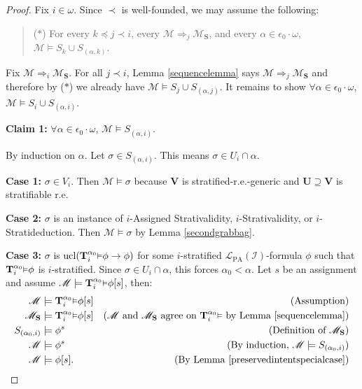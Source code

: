 \documentclass[reqno]{article}
\theoremstyle{definition}
\def\L{\mathscr{L}}
\def\M{\mathscr{M}}
\def\T{\mathbf{T}}
\def\S{\mathbf{S}}
\def\U{\mathbf{U}}
\def\V{\mathbf{V}}
\def\LPA{\L_{\mathrm{PA}}}
\def\epom{\epsilon_0\cdot\omega}
\def\indset{\mathcal I}
\def\myequiv{\Rightarrow}
\newcommand{\Prr}[2]{\T^{#1}_{#2}\mbox{\small${\vDash}$}}
\newcommand{\ucl}[1]{\mathrm{ucl}(#1)}
\newcommand{\case}[1]{\textbf{Case #1:}}
\newcommand{\claim}[1]{\textbf{Claim #1:}}
\begin{document}
\begin{proof}
Fix $i\in\omega$.  Since $\prec$ is well-founded, we may assume the following:
\begin{quote}
($*$) For every $k\preceq j\prec i$,
every $\M\myequiv_j\M_\S$, and every $\alpha\in\epom$,
$\M\models S_k\cup S_{(\alpha,k)}$.
\end{quote}
Fix $\M\myequiv_i\M_\S$.
For all $j\prec i$,
Lemma \ref{sequencelemma} says $\M\myequiv_j\M_\S$
and therefore by ($*$) we already have $\M\models S_j\cup S_{(\alpha,j)}$.
It remains to show $\forall \alpha\in\epom$, $\M\models S_i\cup S_{(\alpha,i)}$.

\item
\claim1
$\forall \alpha\in\epom$, $\M\models S_{(\alpha,i)}$.

\item
By induction on $\alpha$.
Let $\sigma\in S_{(\alpha,i)}$.
This means $\sigma\in U_i\cap\alpha$.

\item
\case1
$\sigma\in V_i$.
Then $\M\models\sigma$ because
$\V$ is stratified-r.e.-generic and $\U\supseteq\V$
is stratifiable r.e.

\item
\case2
$\sigma$ is an instance of $i$-Assigned Strativalidity, $i$-Strativalidity,
or $i$-Stratideduction.  Then $\M\models\sigma$
by Lemma \ref{secondgrabbag}.

\item
\case3
$\sigma$ is $\ucl{\Prr{\alpha_0} i\phi\rightarrow\phi}$ for some
$i$-stratified $\LPA(\indset)$-formula $\phi$ such that $\Prr{\alpha_0}i\phi$ is $i$-stratified.
Since $\sigma\in U_i\cap\alpha$, this forces $\alpha_0<\alpha$.
Let $s$ be an assignment and assume $\M\models\Prr{\alpha_0}i\phi[s]$, then:
\begin{align*}
\M &\models \Prr{\alpha_0} i\phi[s]
  &\mbox{(Assumption)}\\
\M_\S &\models \Prr{\alpha_0} i\phi[s]
  &\mbox{($\M$ and $\M_\S$ agree on $\Prr{\alpha_0} i$ by Lemma \ref{sequencelemma})}\\
S_{(\alpha_0,i)} &\models \phi^s
  &\mbox{(Definition of $\M_\S$)}\\
\M &\models \phi^s
  &\mbox{(By induction, $\M\models S_{(\alpha_0,i)}$)}\\
\M &\models \phi[s].
  &\mbox{(By Lemma \ref{preservedintentspecialcase})}
\end{align*}



\end{proof}
\end{document}
